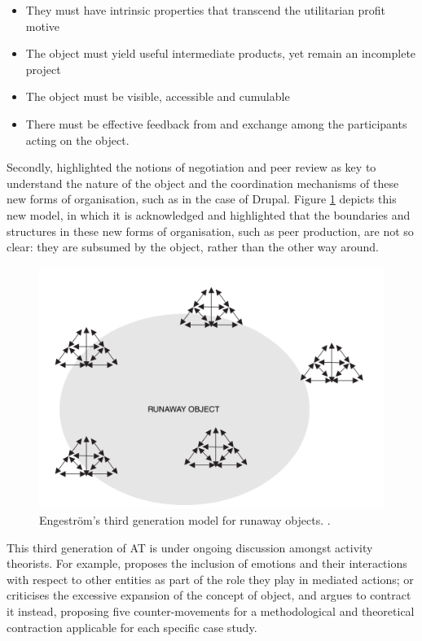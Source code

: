 \begin{itemize}
	\item They must have intrinsic properties that transcend the utilitarian profit motive
	\item The object must yield useful intermediate products, yet remain an incomplete project
	\item The object must be visible, accessible and cumulable
	\item There must be effective feedback from and exchange among the participants acting on the object.
\end{itemize}

Secondly, \textcite[314-317]{engestrom_future_2009} highlighted the notions of negotiation and peer review as key to understand the nature of the object and the coordination mechanisms of these new forms of organisation, such as in the case of Drupal. Figure \ref{engestrom-diagram-third-gen-b} depicts this new model, in which it is acknowledged and highlighted that the boundaries and structures in these new forms of organisation, such as peer production, are not so clear: they are subsumed by the object, rather than the other way around.

\begin{figure}[H]
	\centering
	\includegraphics[scale=0.5]{img/engestrom_third_gen_b.png}
	\caption[Engestr{\"o}m's third generation model for runaway objects]%
	{Engestr{\"o}m's third generation model for runaway objects. \textcite[306]{engestrom_future_2009}.}
	\label{engestrom-diagram-third-gen-b}
\end{figure}

This third generation of AT is under ongoing discussion amongst activity theorists. For example, \textcite{roth2007emotion} proposes the inclusion of emotions and their interactions with respect to other entities as part of the role they play in mediated actions; or \textcite{spinuzzi2011losing} criticises the excessive expansion of the concept of object, and argues to contract it instead, proposing five counter-movements for a methodological and theoretical contraction applicable for each specific case study.


